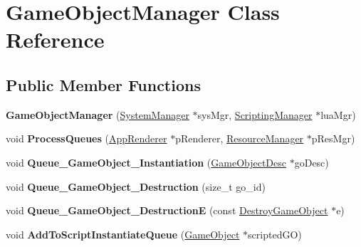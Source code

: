 \hypertarget{classGameObjectManager}{}\section{Game\+Object\+Manager Class Reference}
\label{classGameObjectManager}
\subsection*{Public Member Functions}
\begin{DoxyCompactItemize}
\item 
\mbox{\label{classGameObjectManager_af092ff9e97731c99cb0d4f258d7d4949}} 
{\bfseries Game\+Object\+Manager} (\hyperlink{classSystemManager}{System\+Manager} $\ast$sys\+Mgr, \hyperlink{classScriptingManager}{Scripting\+Manager} $\ast$lua\+Mgr)
\item 
\mbox{\label{classGameObjectManager_a9456fff658ca2a9c13490a8a5635644c}} 
void {\bfseries Process\+Queues} (\hyperlink{classAppRenderer}{App\+Renderer} $\ast$p\+Renderer, \hyperlink{classResourceManager}{Resource\+Manager} $\ast$p\+Res\+Mgr)
\item 
\mbox{\label{classGameObjectManager_a031d2e21f35fb9c84ad01b25330a75a1}} 
void {\bfseries Queue\+\_\+\+Game\+Object\+\_\+\+Instantiation} (\hyperlink{structGameObjectDesc}{Game\+Object\+Desc} $\ast$go\+Desc)
\item 
\mbox{\label{classGameObjectManager_a79fb81780af71ad130541f47dc281a4c}} 
void {\bfseries Queue\+\_\+\+Game\+Object\+\_\+\+Destruction} (size\+\_\+t go\+\_\+id)
\item 
\mbox{\label{classGameObjectManager_ac6d00fb01e702114b16784cf71221798}} 
void {\bfseries Queue\+\_\+\+Game\+Object\+\_\+\+DestructionE} (const \hyperlink{classDestroyGameObject}{Destroy\+Game\+Object} $\ast$e)
\item 
\mbox{\label{classGameObjectManager_a8520515811ae62ac9c1a086ae2a886f3}} 
void {\bfseries Add\+To\+Script\+Instantiate\+Queue} (\hyperlink{classGameObject}{Game\+Object} $\ast$scripted\+GO)
\item 
\mbox{\label{classGameObjectManager_a7507d2f3f5628774a47528705cf9ed49}} 

\end{DoxyCompactItemize}

